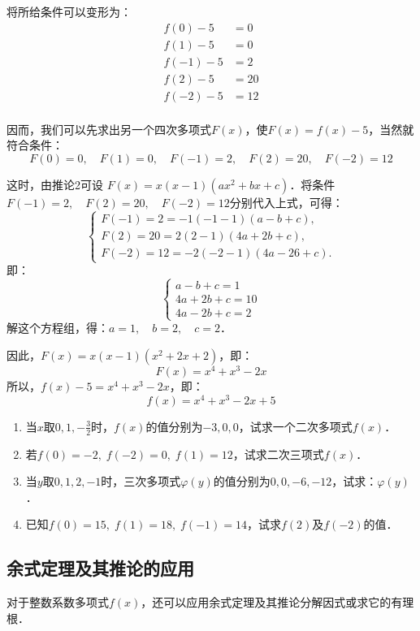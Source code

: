 \begin{solution}
    将所给条件可以变形为：  
\[\begin{split}
    f(0)-5&=0\\
    f(1)-5&=0\\
    f(-1)-5&=2\\
    f(2)-5&=20\\
    f(-2)-5&=12\\
\end{split}\]

因而，我们可以先求出另一个四次多项式$F(x)$，使$F(x)=f(x)-5$，当然就符合条件：
\[F(0)=0,\quad F (1) =0,\quad  F (-1) =2,\quad F (2) =20,\quad  F (-2) =12\]

这时，由推论2可设
$F (x) =x (x-1) (ax^2+bx+c)$．将条件$F(-1)=2,\quad F(2)=20,\quad F(-2)=12$分别代入上式，可得：
\[\begin{cases}
    F (-1) =2=-1 (-1-1) (a-b+c),\\
    F (2) =20=2 (2-1) (4a+2b+c),\\
    F (-2) =12=-2 (-2-1) (4a-26+c). 
\end{cases}\]
即：\[\begin{cases}
    a-b+c=1\\
4a+2b+c=10\\
4a-2b+c=2
\end{cases}\]
解这个方程组，得：$a=1,\quad b=2,\quad c=2$．

因此，$F(x)=x(x-1)(x^2+2x+2)$，即：
\[F(x)=x^4+x^3-2x\]
所以，$f(x)-5=x^4+x^3-2x$，即：
\[f(x)=x^4+x^3-2x+5\]
\end{solution}

\begin{ex}
\begin{enumerate}
    \item 当$x$取$0,1,-\frac{3}{2}$时，$f(x)$的值分别为$-3,0,0$，试求一个二次多项式$f(x)$．
\item 若$f(0)=-2,\; f(-2)=0,\; f(1)=12$，试求二次三项式$f(x)$．
\item 当$y$取$0, 1, 2,-1$时，三次多项式$\varphi(y)$的值分别为$0, 0,-6,-12$，试求：$\varphi(y)$．
\item 已知$f(0)=15,\; f(1)=18,\; f(-1)=14$，试求$f(2)$及$f(-2)$的值．
\end{enumerate}
\end{ex}

\subsection{余式定理及其推论的应用}
对于整数系数多项式$f(x)$，还可以应用余式定理及其推论分解因式或求它的有理根．


